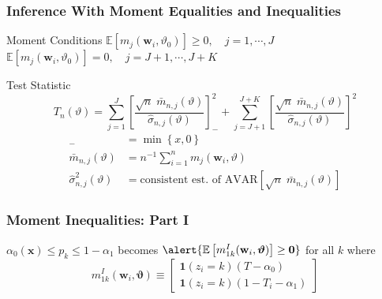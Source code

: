 \documentclass{beamer}
\begin{document}
\begin{frame}
  \frametitle{Inference With Moment Equalities and Inequalities}
  \small

\begin{block}{Moment Conditions}
  $\mathbb{E} \left[ m_j(\mathbf{w}_i,\vartheta_0) \right] \geq 0, \quad j = 1, \cdots, J$\\
  $\mathbb{E} \left[ m_j(\mathbf{w}_i,\vartheta_0) \right]  = 0, \quad j = J+1, \cdots, J + K$
\end{block}


\begin{block}{Test Statistic}
  \vspace{-1em}
\[
  T_n(\vartheta) = \sum_{j=1}^J \left[\frac{\sqrt{n}\; \bar{m}_{n,j}(\vartheta)}{\widehat{\sigma}_{n,j}(\vartheta)}\right]^2_- + \sum_{j=J+1}^{J+K} \left[\frac{\sqrt{n}\; \bar{m}_{n,j}(\vartheta)}{\widehat{\sigma}_{n,j}(\vartheta)}\right]^2
\]
\footnotesize
\begin{align*}
[x]_- &= \min\left\{ x, 0 \right\}\\
\bar{m}_{n,j}(\vartheta) &= n^{-1} \sum_{i=1}^{n} m_j(\mathbf{w}_i, \vartheta)\\
\widehat{\sigma}^2_{n,j}(\vartheta) &=  \mbox{consistent est.\ of } \mbox{AVAR}\left[  \sqrt{n}\; \bar{m}_{n,j}(\vartheta)\right]
\end{align*}
\end{block}

\end{frame}
\begin{frame}
  \frametitle{Moment Inequalities: Part I}

  $\alpha_0(\mathbf{x}) \leq p_k \leq 1 - \alpha_1$ becomes $\alert{\mathbb{E}\left[ m_{1k}^I(\mathbf{w}_i,\boldsymbol{\vartheta} ) \right] \geq \mathbf{0}}$ for all $k$ where
\[
  m_{1k}^I(\mathbf{w}_i, \boldsymbol{\vartheta}) \equiv \left[
  \begin{array}{l}
    \mathbf{1}(z_i=k)(T - \alpha_0) \\
    \mathbf{1}(z_i = k) (1 - T_i - \alpha_1) 
  \end{array}
\right]
\]
  
\end{frame}
\end{document}
